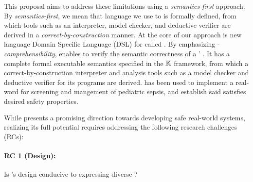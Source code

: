
This proposal aims to address these limitations using a \emph{semantics-first} approach.
By \emph{semantics-first}, we mean that \CIG{} language we
use to is formally defined, from which tools such as an interpreter, model checker,
and deductive verifier are derived in a \emph{correct-by-construction}
manner. At the core of our approach is new language Domain Specific Language (DSL)
for \CIGs{} called \MediK{}. By emphasizing \HCP{}-\emph{comprehensibility},
\MediK{} enables \HCPs{} to verify the semantic correctness of a \CDSSs{}' \BPGLogic{}.
It has a complete formal executable semantics specified in the $\mathbb{K}{}$ framework,
from which a correct-by-construction interpreter and analysis tools
such as a model checker and deductive verifier for its programs are derived.
\MediK{} has been used to implement a real-word \CDSS{} for screening and
mangement of pediatric sepsis, and establish said \CDSS{} satisfies desired
safety properties.

While \MediK{} presents a promising direction towards developing safe real-world
systems, realizing its full potential requires addressing the following research
challenges (RCs):

\paragraph{RC 1 (Design):} Is \MediK{}'s design conducive to expressing diverse \BPGs{}?

